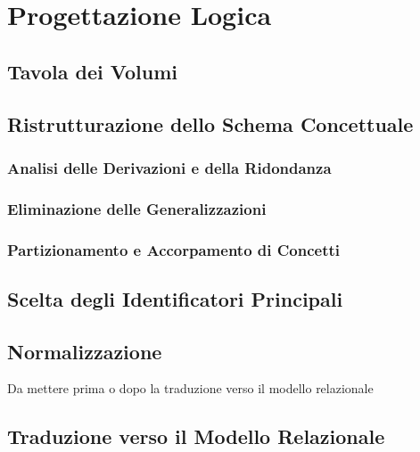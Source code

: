 \section{Progettazione Logica}
	\subsection{Tavola dei Volumi}
	\subsection{Ristrutturazione dello Schema Concettuale}
		\subsubsection{Analisi delle Derivazioni e della Ridondanza}
		\subsubsection{Eliminazione delle Generalizzazioni}
		\subsubsection{Partizionamento e Accorpamento di Concetti}
	\subsection{Scelta degli Identificatori Principali}
	\subsection{Normalizzazione}
		Da mettere prima o dopo la traduzione verso il modello relazionale
	\subsection{Traduzione verso il Modello Relazionale}
	
